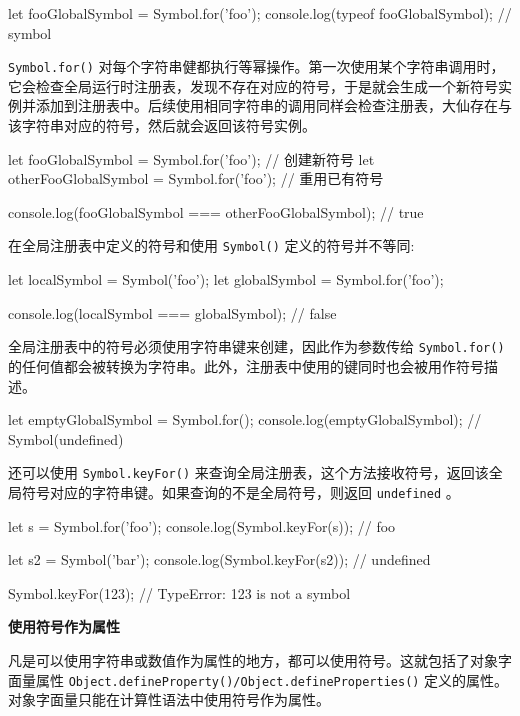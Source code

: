 \begin{JavaScript}
let fooGlobalSymbol = Symbol.for('foo');
console.log(typeof fooGlobalSymbol);    // symbol
\end{JavaScript}

\texttt{Symbol.for()} 对每个字符串健都执行等幂操作。第一次使用某个字符串调用时，它会检查全局运行时注册表，发现不存在对应的符号，于是就会生成一个新符号实例并添加到注册表中。后续使用相同字符串的调用同样会检查注册表，大仙存在与该字符串对应的符号，然后就会返回该符号实例。

\begin{JavaScript}
let fooGlobalSymbol = Symbol.for('foo');        // 创建新符号
let otherFooGlobalSymbol = Symbol.for('foo');   // 重用已有符号

console.log(fooGlobalSymbol === otherFooGlobalSymbol);  // true
\end{JavaScript}

在全局注册表中定义的符号和使用 \texttt{Symbol()} 定义的符号并不等同:

\begin{JavaScript}
let localSymbol = Symbol('foo');
let globalSymbol = Symbol.for('foo');

console.log(localSymbol === globalSymbol);  // false
\end{JavaScript}

全局注册表中的符号必须使用字符串键来创建，因此作为参数传给 \texttt{Symbol.for()} 的任何值都会被转换为字符串。此外，注册表中使用的键同时也会被用作符号描述。

\begin{JavaScript}
let emptyGlobalSymbol = Symbol.for();
console.log(emptyGlobalSymbol);     // Symbol(undefined)
\end{JavaScript}

还可以使用 \texttt{Symbol.keyFor()} 来查询全局注册表，这个方法接收符号，返回该全局符号对应的字符串键。如果查询的不是全局符号，则返回 \texttt{undefined} 。

\begin{JavaScript}
let s = Symbol.for('foo');
console.log(Symbol.keyFor(s));      // foo

let s2 = Symbol('bar');
console.log(Symbol.keyFor(s2));     // undefined

Symbol.keyFor(123);                 // TypeError: 123 is not a symbol
\end{JavaScript}

\noindent\textbf{使用符号作为属性}

凡是可以使用字符串或数值作为属性的地方，都可以使用符号。这就包括了对象字面量属性 \texttt{Object.defineProperty()/Object.defineProperties()} 定义的属性。对象字面量只能在计算性语法中使用符号作为属性。


\newpage